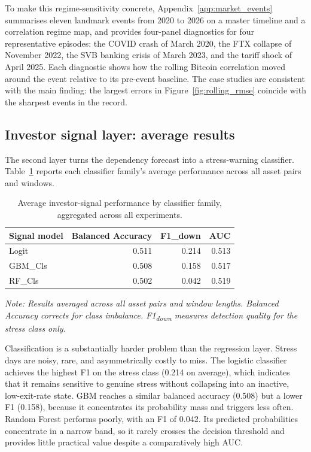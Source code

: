 To make this regime-sensitivity concrete, Appendix~\ref{app:market_events} summarises eleven landmark events from 2020 to 2026 on a master timeline and a correlation regime map, and provides four-panel diagnostics for four representative episodes: the COVID crash of March 2020, the FTX collapse of November 2022, the SVB banking crisis of March 2023, and the tariff shock of April 2025. Each diagnostic shows how the rolling Bitcoin correlation moved around the event relative to its pre-event baseline. The case studies are consistent with the main finding: the largest errors in Figure~\ref{fig:rolling_rmse} coincide with the sharpest events in the record.

\subsection{Investor signal layer: average results}

The second layer turns the dependency forecast into a stress-warning classifier. Table~\ref{tab:signal_summary} reports each classifier family's average performance across all asset pairs and windows.

\begin{table}[H]
    \centering
    \caption{Average investor-signal performance by classifier family, aggregated across all experiments.}
    \label{tab:signal_summary}
    \begin{tabular}{lrrr}
        \toprule
        Signal model & Balanced Accuracy & F1\_down & AUC \\
        \midrule
        Logit    & 0.511 & 0.214 & 0.513 \\
        GBM\_Cls & 0.508 & 0.158 & 0.517 \\
        RF\_Cls  & 0.502 & 0.042 & 0.519 \\
        \bottomrule
    \end{tabular}
    \par\smallskip\noindent\footnotesize{\textit{Note: Results averaged across all asset pairs and window lengths. Balanced Accuracy corrects for class imbalance. F1\textsubscript{down} measures detection quality for the stress class only.}}
\end{table}

Classification is a substantially harder problem than the regression layer. Stress days are noisy, rare, and asymmetrically costly to miss. The logistic classifier achieves the highest F1 on the stress class (0.214 on average), which indicates that it remains sensitive to genuine stress without collapsing into an inactive, low-exit-rate state. GBM reaches a similar balanced accuracy (0.508) but a lower F1 (0.158), because it concentrates its probability mass and triggers less often. Random Forest performs poorly, with an F1 of 0.042. Its predicted probabilities concentrate in a narrow band, so it rarely crosses the decision threshold and provides little practical value despite a comparatively high AUC.

